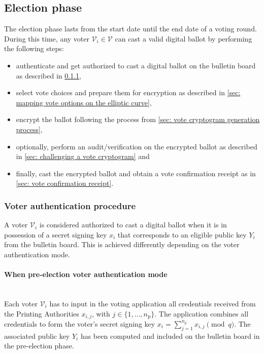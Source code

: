 \subsection{Election phase} \label{sec: election phase}
The election phase lasts from the start date until the end date of a voting round. During this time, any voter $\mathcal{V}_i \in \boldsymbol{\mathcal{V}}$ can cast a valid digital ballot by performing the following steps:
\begin{itemize}
    \item authenticate and get authorized to cast a digital ballot on the bulletin board as described in \cref{sec: voter authentication procedure},
    \item select vote choices and prepare them for encryption as described in \cref{sec: mapping vote options on the elliptic curve},
    \item encrypt the ballot following the process from \cref{sec: vote cryptogram generation process},
    \item optionally, perform an audit/verification on the encrypted ballot as described in \cref{sec: challenging a vote cryptogram} and
    \item finally, cast the encrypted ballot and obtain a vote confirmation receipt as in \cref{sec: vote confirmation receipt}.
\end{itemize}


\subsubsection{Voter authentication procedure} \label{sec: voter authentication procedure}
A voter $\mathcal{V}_i$ is considered authorized to cast a digital ballot when it is in possession of a secret signing key $x_i$ that corresponds to an eligible public key $Y_i$ from the bulletin board. This is achieved differently depending on the voter authentication mode.


\paragraph{When pre-election voter authentication mode}\mbox{}\\
Each voter $\mathcal{V}_i$ has to input in the voting application all credentials received from the Printing Authorities $x_{i, j}$, with $j \in \{ 1, ..., n_\mathrm{p} \}$. The application combines all credentials to form the voter's secret signing key $x_i = \sum_{j=1}^{n_\mathrm{p}} x_{i, j} \pmod q$. The associated public key $Y_i$ has been computed and included on the bulletin board in the pre-election phase.


